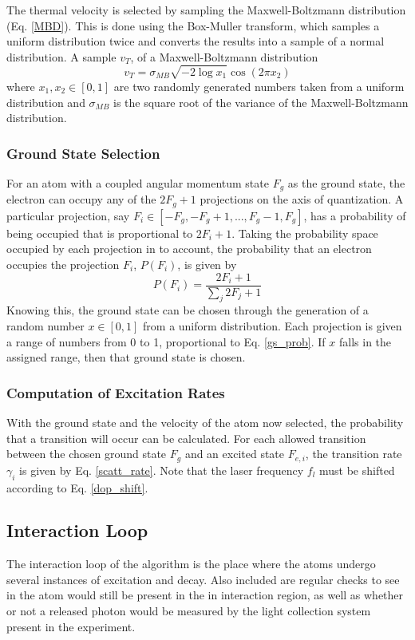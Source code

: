 The thermal velocity is selected by sampling the Maxwell-Boltzmann distribution (Eq. \ref{MBD}). This is done using the Box-Muller transform, which samples a uniform distribution twice and converts the results into a sample of a normal distribution. A sample $v_T$, of a Maxwell-Boltzmann distribution
\begin{equation}
v_T = \sigma_{MB} \sqrt{-2\log x_1}\cos (2\pi x_2)
\end{equation}
where $x_1,x_2 \in [0,1]$ are two randomly generated numbers taken from a uniform distribution and $\sigma_{MB}$ is the square root of the variance of the Maxwell-Boltzmann distribution. 

\subsubsection{Ground State Selection}
For an atom with a coupled angular momentum state $F_g$ as the ground state, the electron can occupy any of the $2F_g+1$ projections on the axis of quantization. A particular projection, say $F_i \in [-F_g,-F_g+1,...,F_g-1,F_g]$, has a probability of being occupied that is proportional to $2F_i+1$. Taking the probability space occupied by each projection in to account, the probability that an electron occupies the projection $F_i$, $P(F_i)$, is given by
\begin{equation}
P(F_i) = \frac{2F_i+1}{\sum_j 2F_j+1}
\label{gs_prob}
\end{equation}
Knowing this, the ground state can be chosen through the generation of a random number $x \in [0,1]$ from a uniform distribution. Each projection is given a range of numbers from 0 to 1, proportional to Eq. \ref{gs_prob}. If $x$ falls in the assigned range, then that ground state is chosen. 

\subsubsection{Computation of Excitation Rates}
With the ground state and the velocity of the atom now selected, the probability that a transition will occur can be calculated. For each allowed transition between the chosen ground state $F_g$ and an excited state $F_{e,i}$, the transition rate $\gamma_i$ is given by Eq. \ref{scatt_rate}. Note that the laser frequency $f_l$ must be shifted according to Eq. \ref{dop_shift}.

\subsection{Interaction Loop}
The interaction loop of the algorithm is the place where the atoms undergo several instances of excitation and decay. Also included are regular checks to see in the atom would still be present in the in interaction region, as well as whether or not a released photon would be measured by the light collection system present in the experiment.

